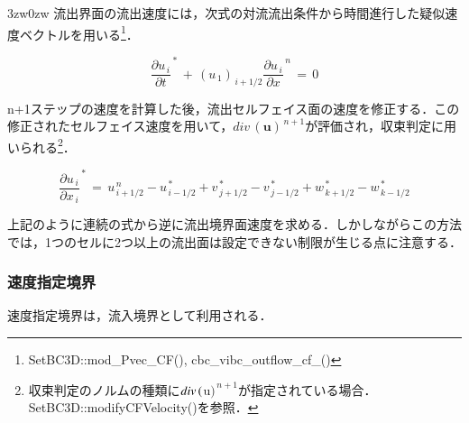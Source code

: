 \begin{indentation}{3zw}{0zw}
流出界面の流出速度には，次式の対流流出条件から時間進行した疑似速度ベクトルを用いる\footnote{SetBC3D::mod\_Pvec\_CF(), cbc\_vibc\_outflow\_cf\_()}．

\begin{equation}
{\frac{\partial u_{\,i}}{\partial t}}^{\,*} \,+\, {\left( u_{\,1} \right)}_{\,i+1/2} {\frac{\partial u_{\,i}}{\partial x}}^{\,n} \,=\, 0
\label{eq:outflow_cv}
\end{equation}


n+1ステップの速度を計算した後，流出セルフェイス面の速度を修正する．この修正されたセルフェイス速度を用いて，$div\,(\bm{u})^{\,n+1}$が評価され，収束判定に用いられる\footnote{収束判定のノルムの種類に$div\,(\boldmath $u$)^{\,n+1}$が指定されている場合．SetBC3D::modifyCFVelocity()を参照．}．

\begin{equation}
{\frac{\partial u_{\,i}}{\partial x_{\,i}}}^{\,*} \,=\, u_{\,i+1/2}^{\,n}-u_{\,i-1/2}^{\,*} + v_{\,j+1/2}^{\,*} - v_{\,j-1/2}^{\,*} + w_{\,k+1/2}^{\,*} - w_{\,k-1/2}^{\,*}
\label{eq:outflow modify poisson src}
\end{equation}

上記のように連続の式から逆に流出境界面速度を求める．しかしながらこの方法では，1つのセルに2つ以上の流出面は設定できない制限が生じる点に注意する．


\end{indentation}

\pagebreak
%
\hypertarget{tgt:inflow}{\subsubsection{速度指定境界}}
\label{sec:BC inflow}

速度指定境界は，流入境界として利用される．

